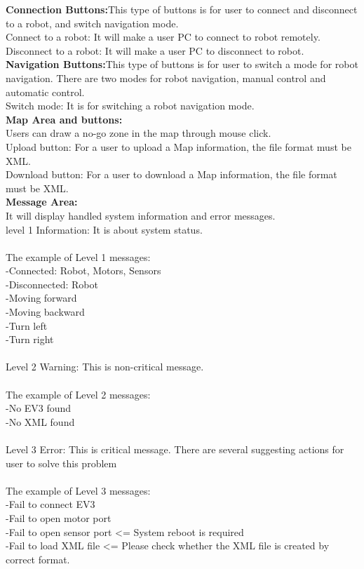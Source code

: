 \documentclass[10pt,a4paper,titlepage]{article}
\begin{document}
\textbf {Connection Buttons:}This type of buttons is for user to connect and disconnect to a robot, and switch navigation mode.\\
Connect to a robot: It will make a user PC to connect to robot remotely.\\
Disconnect to a robot: It will make a user PC to disconnect to robot.\\

\textbf {Navigation Buttons:}This type of buttons is for user to switch a mode for robot navigation. There are two modes for robot navigation, manual control and automatic control.\\

Switch mode: It is for switching a robot navigation mode.\\

\textbf{Map Area and buttons:}\\
Users can draw a no-go zone in the map through mouse click.\\
Upload button: For a user to upload a Map information, the file format must be XML.\\
Download button: For a user to download a Map information, the file format must be XML.\\


\textbf{Message Area:}\\
It will display handled system information and error messages.\\

level 1 Information: It is about system status.\\\\
The example of Level 1 messages:\\
-Connected: Robot, Motors, Sensors\\
-Disconnected: Robot\\
-Moving forward\\
-Moving backward\\
-Turn left\\
-Turn right\\\\

Level 2 Warning: This is non-critical message.\\\\
The example of Level 2 messages:\\
-No EV3 found\\
-No XML found\\\\

Level 3 Error: This is critical message. There are several suggesting actions for user to solve this problem\\\\
The example of Level 3 messages:\\
-Fail to connect EV3\\
-Fail to open motor port\\
-Fail to open sensor port <= System reboot is required\\
-Fail to load XML file <= Please check whether the XML file is created by correct format.\\\\
\end{document}
